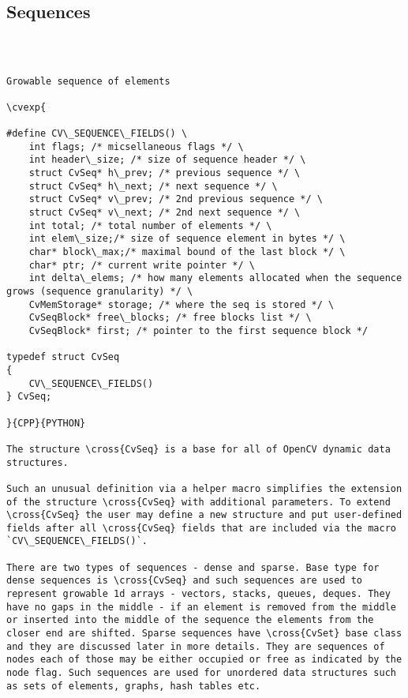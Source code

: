 \subsection{Sequences}
\begin{verbatim}


\end{verbatim}
\begin{verbatim}

Growable sequence of elements

\cvexp{

#define CV\_SEQUENCE\_FIELDS() \
    int flags; /* micsellaneous flags */ \
    int header\_size; /* size of sequence header */ \
    struct CvSeq* h\_prev; /* previous sequence */ \
    struct CvSeq* h\_next; /* next sequence */ \
    struct CvSeq* v\_prev; /* 2nd previous sequence */ \
    struct CvSeq* v\_next; /* 2nd next sequence */ \
    int total; /* total number of elements */ \
    int elem\_size;/* size of sequence element in bytes */ \
    char* block\_max;/* maximal bound of the last block */ \
    char* ptr; /* current write pointer */ \
    int delta\_elems; /* how many elements allocated when the sequence grows (sequence granularity) */ \
    CvMemStorage* storage; /* where the seq is stored */ \
    CvSeqBlock* free\_blocks; /* free blocks list */ \
    CvSeqBlock* first; /* pointer to the first sequence block */

typedef struct CvSeq
{
    CV\_SEQUENCE\_FIELDS()
} CvSeq;

}{CPP}{PYTHON}

The structure \cross{CvSeq} is a base for all of OpenCV dynamic data structures.

Such an unusual definition via a helper macro simplifies the extension of the structure \cross{CvSeq} with additional parameters. To extend \cross{CvSeq} the user may define a new structure and put user-defined fields after all \cross{CvSeq} fields that are included via the macro `CV\_SEQUENCE\_FIELDS()`.

There are two types of sequences - dense and sparse. Base type for dense sequences is \cross{CvSeq} and such sequences are used to represent growable 1d arrays - vectors, stacks, queues, deques. They have no gaps in the middle - if an element is removed from the middle or inserted into the middle of the sequence the elements from the closer end are shifted. Sparse sequences have \cross{CvSet} base class and they are discussed later in more details. They are sequences of nodes each of those may be either occupied or free as indicated by the node flag. Such sequences are used for unordered data structures such as sets of elements, graphs, hash tables etc.


\end{verbatim}
